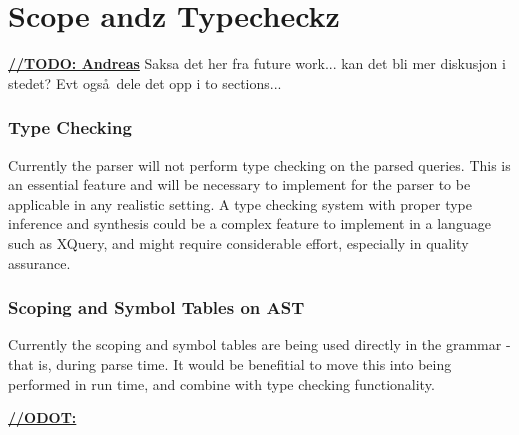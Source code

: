 \section{Scope andz Typecheckz}

\underline{\textbf{\LARGE //TODO: Andreas}} Saksa det her fra future work... kan det bli mer diskusjon i stedet? Evt ogs\aa~dele det opp i to sections...

\subsubsection{Type Checking}
Currently the parser will not perform type checking on the parsed queries. This
is an essential feature and will be necessary to implement for the parser to be
applicable in any realistic setting. A type checking system with proper type
inference and synthesis could be a complex feature to implement in a language
such as XQuery, and might require considerable effort, especially in quality
assurance. 

\subsubsection{Scoping and Symbol Tables on AST}
Currently the scoping and symbol tables are being used directly in the grammar -
that is, during parse time. It would be benefitial to move this into being
performed in run time, and combine with type checking functionality.

\underline{\textbf{\LARGE //ODOT:}}